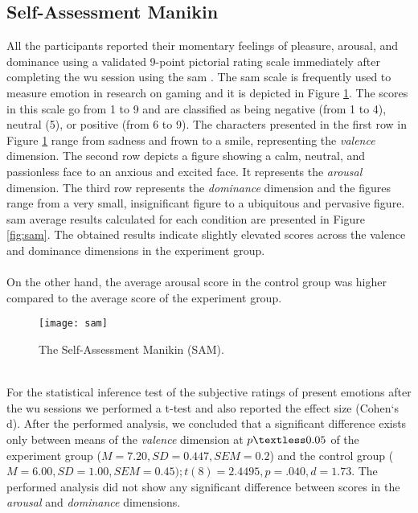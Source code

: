 \subsection{Self-Assessment Manikin}
All the participants reported their momentary feelings of pleasure, arousal, and dominance using a validated 9-point pictorial rating scale immediately after completing the \acrshort{wu} session using the \acrfull{sam} \cite{bradley1994measuring}. The \acrshort{sam} scale is frequently used to measure emotion in research on gaming \cite{poels2012pleasure} and it is depicted in Figure \ref{fig:samoverview}. The scores in this scale go from 1 to 9 and are classified as being negative (from 1 to 4), neutral (5), or positive (from 6 to 9). The characters presented in the first row in Figure \ref{fig:samoverview} range from sadness and frown to
a smile, representing the \textit{valence} dimension. The second row depicts a figure showing a calm, neutral, and passionless face to an anxious and excited face. It represents the \textit{arousal} dimension. The third row represents the \textit{dominance} dimension and the figures range from a very small, insignificant figure to a ubiquitous and pervasive figure. \acrshort{sam} average results calculated for each condition are presented in Figure \ref{fig:sam}. The obtained results indicate slightly elevated scores across the valence and dominance dimensions in the experiment group. \\\\On the other hand, the average arousal score in the control group was higher compared to the average score of the experiment group. 
\begin{figure}[h]
    \centering
    \texttt{[image: sam]}
    \caption{The Self-Assessment Manikin (SAM).}
    \label{fig:samoverview}
\end{figure}\\
For the statistical inference test of the subjective ratings of present emotions after the \acrshort{wu} sessions we performed a t-test and also reported the effect size (Cohen`s d). After the performed analysis, we concluded that a significant difference exists only between means of the \textit{valence} dimension at  \begin{math}p \textless  0.05 \end{math} of the experiment group (\begin{math}M = 7.20, SD = 0.447, SEM = 0.2\end{math}) and the control group (\begin{math}M = 6.00, SD= 1.00, SEM = 0.45); t(8) = 2.4495, p = .040, d =1.73\end{math}.  The performed analysis did not show any significant difference between scores in the \textit{arousal} and \textit{dominance} dimensions.\\
